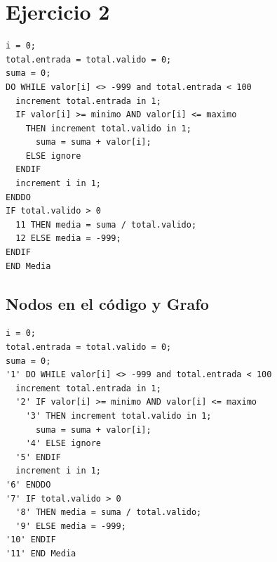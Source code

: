 \documentclass[a4paper,12pt]{article}
\begin{document}
\section{Ejercicio 2}

\begin{lstlisting}
i = 0;
total.entrada = total.valido = 0;
suma = 0;
DO WHILE valor[i] <> -999 and total.entrada < 100
  increment total.entrada in 1;
  IF valor[i] >= minimo AND valor[i] <= maximo
    THEN increment total.valido in 1;
      suma = suma + valor[i];
    ELSE ignore
  ENDIF
  increment i in 1;
ENDDO
IF total.valido > 0
  11 THEN media = suma / total.valido;
  12 ELSE media = -999;
ENDIF
END Media
\end{lstlisting}

\subsection{Nodos en el código y Grafo}

\begin{lstlisting}
i = 0;
total.entrada = total.valido = 0;
suma = 0;
'1' DO WHILE valor[i] <> -999 and total.entrada < 100
  increment total.entrada in 1;
  '2' IF valor[i] >= minimo AND valor[i] <= maximo
    '3' THEN increment total.valido in 1;
      suma = suma + valor[i];
    '4' ELSE ignore
  '5' ENDIF
  increment i in 1;
'6' ENDDO
'7' IF total.valido > 0
  '8' THEN media = suma / total.valido;
  '9' ELSE media = -999;
'10' ENDIF
'11' END Media 
\end{lstlisting}
\end{document}
